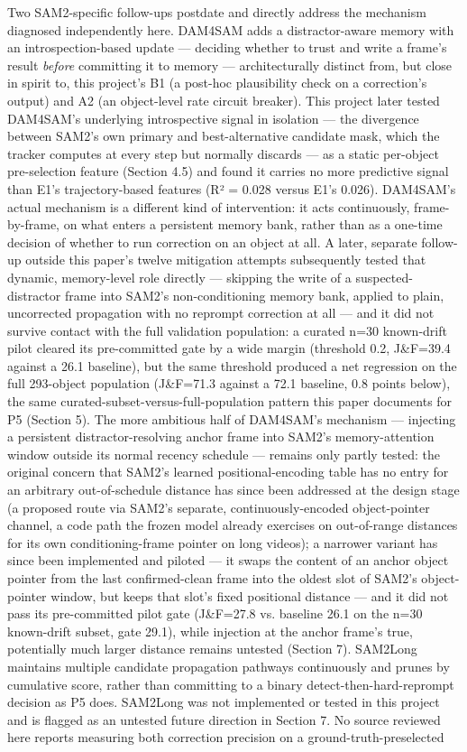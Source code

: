 \documentclass[11pt]{article}
\begin{document}
Two SAM2-specific follow-ups postdate and directly address the mechanism diagnosed independently here. DAM4SAM \citep{videnovic2024} adds a distractor-aware memory with an introspection-based update — deciding whether to trust and write a frame's result \emph{before} committing it to memory — architecturally distinct from, but close in spirit to, this project's B1 (a post-hoc plausibility check on a correction's output) and A2 (an object-level rate circuit breaker). This project later tested DAM4SAM's underlying introspective signal in isolation — the divergence between SAM2's own primary and best-alternative candidate mask, which the tracker computes at every step but normally discards — as a static per-object pre-selection feature (Section 4.5) and found it carries no more predictive signal than E1's trajectory-based features (R² = 0.028 versus E1's 0.026). DAM4SAM's actual mechanism is a different kind of intervention: it acts continuously, frame-by-frame, on what enters a persistent memory bank, rather than as a one-time decision of whether to run correction on an object at all. A later, separate follow-up outside this paper's twelve mitigation attempts subsequently tested that dynamic, memory-level role directly — skipping the write of a suspected-distractor frame into SAM2's non-conditioning memory bank, applied to plain, uncorrected propagation with no reprompt correction at all — and it did not survive contact with the full validation population: a curated n=30 known-drift pilot cleared its pre-committed gate by a wide margin (threshold 0.2, J\&F=39.4 against a 26.1 baseline), but the same threshold produced a net regression on the full 293-object population (J\&F=71.3 against a 72.1 baseline, 0.8 points below), the same curated-subset-versus-full-population pattern this paper documents for P5 (Section 5). The more ambitious half of DAM4SAM's mechanism — injecting a persistent distractor-resolving anchor frame into SAM2's memory-attention window outside its normal recency schedule — remains only partly tested: the original concern that SAM2's learned positional-encoding table has no entry for an arbitrary out-of-schedule distance has since been addressed at the design stage (a proposed route via SAM2's separate, continuously-encoded object-pointer channel, a code path the frozen model already exercises on out-of-range distances for its own conditioning-frame pointer on long videos); a narrower variant has since been implemented and piloted — it swaps the content of an anchor object pointer from the last confirmed-clean frame into the oldest slot of SAM2's object-pointer window, but keeps that slot's fixed positional distance — and it did not pass its pre-committed pilot gate (J\&F=27.8 vs. baseline 26.1 on the n=30 known-drift subset, gate 29.1), while injection at the anchor frame's true, potentially much larger distance remains untested (Section 7). SAM2Long \citep{ding2024} maintains multiple candidate propagation pathways continuously and prunes by cumulative score, rather than committing to a binary detect-then-hard-reprompt decision as P5 does. SAM2Long was not implemented or tested in this project and is flagged as an untested future direction in Section 7. No source reviewed here reports measuring both correction precision on a ground-truth-preselected 
\end{document}
